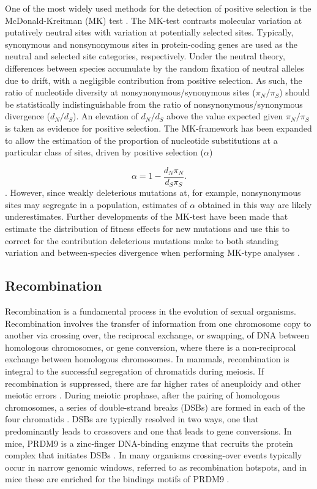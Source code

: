 	One of the most widely used methods for the detection of positive selection is the McDonald-Kreitman (MK) test \citep{RN293}. The MK-test contrasts molecular variation at putatively neutral sites with variation at potentially selected sites. Typically, synonymous and nonsynonymous sites in protein-coding genes are used as the neutral and selected site categories, respectively. Under the neutral theory, differences between species accumulate by the random fixation of neutral  alleles due to drift, with a negligible contribution from positive selection. As such, the ratio of nucleotide diversity at nonsynonymous/synonymous sites ($\pi_N / \pi_S$) should be statistically indistinguishable from the ratio of nonsynonymous/synonymous divergence ($d_N / d_S$). An elevation of $d_N / d_S$ above the value expected given $\pi_N / \pi_S$ is taken as evidence for positive selection. The MK-framework has been expanded to allow the estimation of the proportion of nucleotide substitutions at a particular class of sites, driven by positive selection ($\alpha$)

\begin{equation}
\alpha = 1 - \frac{d_N \pi_N}{d_S \pi_S}.
\end{equation}
\noindent
\citep{RN294}. However, since weakly deleterious mutations at, for example, nonsynonymous sites may segregate in a population, estimates of $\alpha$ obtained in this way are likely underestimates. Further developments of the MK-test have been made that estimate the distribution of fitness effects for new mutations and use this to correct for the contribution deleterious mutations make to both standing variation and between-species divergence when performing MK-type analyses \citep{RN165}. 

\subsection{Recombination}

	Recombination is a fundamental process in the evolution of sexual organisms. Recombination involves the transfer of information from one chromosome copy to another via crossing over, the reciprocal exchange, or swapping, of DNA between homologous chromosomes, or gene conversion, where there is a non-reciprocal exchange between homologous chromosomes. In mammals, recombination is integral to the successful segregation of chromatids during meiosis. If recombination is suppressed, there are far higher rates of aneuploidy and other meiotic errors \citep{RN388}. During meiotic prophase, after the pairing of homologous chromosomes, a series of double-strand breaks (DSBs) are formed in each of the four chromatids \citep{RN388}. DSBs are typically resolved in two ways, one that predominantly leads to crossovers and one that leads to gene conversions. In mice, PRDM9 is a zinc-finger DNA-binding enzyme that recruits the protein complex that initiates DSBs \citep{RN388}. In many organisms crossing-over events typically occur in narrow genomic windows, referred to as recombination hotspots, and in mice these are enriched for the bindings motifs of PRDM9 \citep{RN388}.

